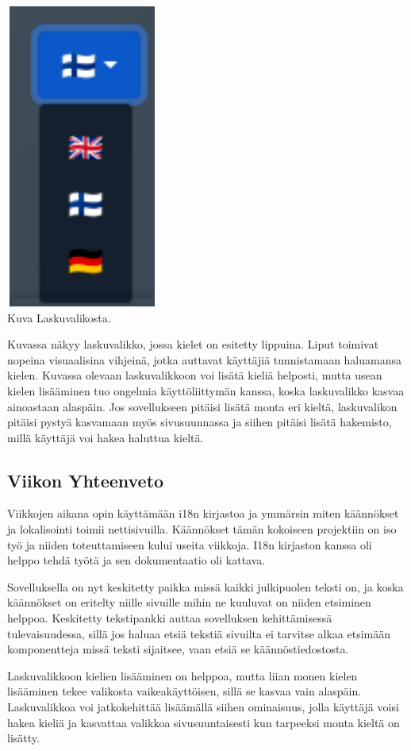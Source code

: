 \medskip
\includegraphics[width= 5cm, height=10cm]{src/public/locale_laskuvalikko.png} \\
\medskip
Kuva Laskuvalikosta.
\medskip

Kuvassa näkyy laskuvalikko, jossa kielet on esitetty lippuina.
Liput toimivat nopeina visuaalisina vihjeinä, jotka auttavat käyttäjiä tunnistamaan haluamansa kielen.
Kuvassa olevaan laskuvalikkoon voi lisätä kieliä helposti, mutta usean kielen lisääminen tuo ongelmia käyttöliittymän kanssa, koska laskuvalikko kasvaa ainoastaan alaspäin.
Jos sovellukseen pitäisi lisätä monta eri kieltä, laskuvalikon pitäisi pystyä kasvamaan myös sivusuunnassa ja siihen pitäisi lisätä hakemisto, millä käyttäjä voi hakea haluttua kieltä.
\medskip



\subsection*{Viikon Yhteenveto}


Viikkojen aikana opin käyttämään i18n kirjastoa ja ymmärsin miten käännökset ja lokalisointi toimii nettisivuilla.
Käännökset tämän kokoiseen projektiin on iso työ ja niiden toteuttamiseen kului useita viikkoja.
I18n kirjaston kanssa oli helppo tehdä työtä ja sen dokumentaatio oli kattava.
\medskip

Sovelluksella on nyt keskitetty paikka missä kaikki julkipuolen teksti on, ja koska käännökset on eritelty niille sivuille mihin ne kuuluvat on niiden etsiminen helppoa.
Keskitetty tekstipankki auttaa sovelluksen kehittämisessä tulevaisuudessa, sillä jos haluaa etsiä tekstiä sivuilta ei tarvitse alkaa etsimään komponentteja missä teksti sijaitsee, vaan etsiä se käännöstiedostosta.\medskip

Laskuvalikkoon kielien lisääminen on helppoa, mutta liian monen kielen lisääminen tekee valikosta vaikeakäyttöisen, sillä se kasvaa vain alaspäin.
Laskuvalikkoa voi jatkokehittää lisäämällä siihen ominaisuus, jolla käyttäjä voisi hakea kieliä ja kasvattaa valikkoa sivusuuntaisesti kun tarpeeksi monta kieltä on lisätty.
